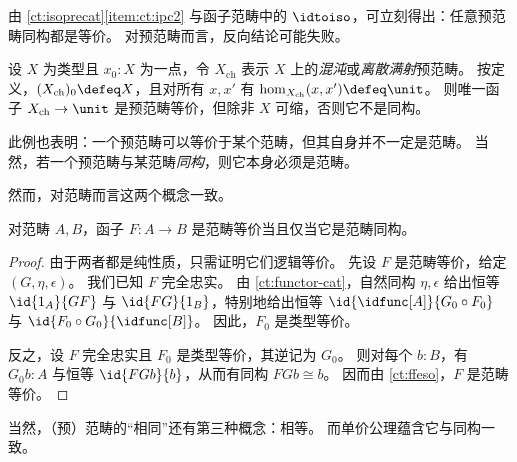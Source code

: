 由 \cref{ct:isoprecat}\ref{item:ct:ipc2} 与函子范畴中的 $\idtoiso$，可立刻得出：任意预范畴同构都是等价。
对预范畴而言，反向结论可能失败。

\begin{eg}\label{ct:chaotic}
  设 $X$ 为类型且 $x_0:X$ 为一点，令 $X_{\mathrm{ch}}$ 表示 $X$ 上的\emph{混沌}或\emph{离散满射}预范畴。
  按定义，$(X_{\mathrm{ch}})_0\defeq X$，且对所有 $x,x'$ 有 $\hom_{X_{\mathrm{ch}}}(x,x') \defeq \unit$。
  则唯一函子 $X_{\mathrm{ch}}\to \unit$ 是预范畴等价，但除非 $X$ 可缩，否则它不是同构。

  此例也表明：一个预范畴可以等价于某个范畴，但其自身并不一定是范畴。
  当然，若一个预范畴与某范畴\emph{同构}，则它本身必须是范畴。
\end{eg}

然而，对范畴而言这两个概念一致。

\begin{lem}\label{ct:eqv-levelwise}
  对范畴 $A,B$，函子 $F:A\to B$ 是范畴等价当且仅当它是范畴同构。
\end{lem}
\begin{proof}
  由于两者都是纯性质，只需证明它们逻辑等价。
  先设 $F$ 是范畴等价，给定 $(G,\eta,\epsilon)$。
  我们已知 $F$ 完全忠实。
  由 \cref{ct:functor-cat}，自然同构 $\eta,\epsilon$ 给出恒等 $\id{1_A}{GF}$ 与 $\id{FG}{1_B}$，特别地给出恒等 $\id{\idfunc[A]}{G_0\circ F_0}$ 与 $\id{F_0\circ G_0}{\idfunc[B]}$。
因此，$F_0$ 是类型等价。

  反之，设 $F$ 完全忠实且 $F_0$ 是类型等价，其逆记为 $G_0$。
  则对每个 $b:B$，有 $G_0 b:A$ 与恒等 $\id{FGb}{b}$，从而有同构 $FGb\cong b$。
  因而由 \cref{ct:ffeso}，$F$ 是范畴等价。
\end{proof}

当然，（预）范畴的“相同”还有第三种概念：相等。
而单价公理蕴含它与同构一致。

